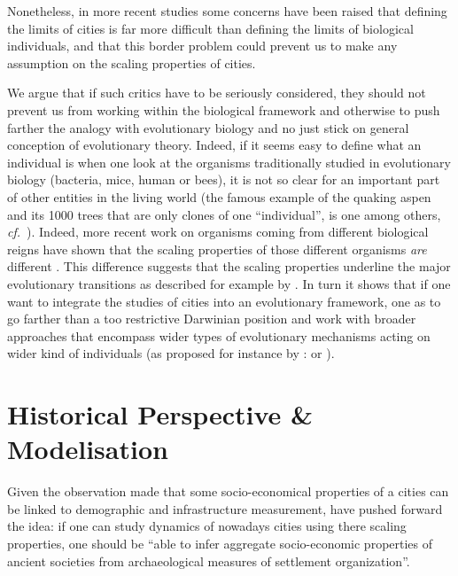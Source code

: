 \documentclass[a4paper,11pt]{article}
\begin{document}
Nonetheless, in more recent studies \citep{arcaute2015constructingcitiesdeconstructingscalinglaws} some concerns have been raised that defining the limits of cities is far more difficult than defining the limits of biological individuals, and that this border problem could prevent us to make any assumption on the scaling properties of cities. 

We argue that if such critics have to be seriously considered, they should not prevent us from working within the biological framework and otherwise to push farther the analogy with evolutionary biology and no just stick on general conception of evolutionary theory. Indeed, if it seems easy to define what an individual is when one look at the organisms traditionally studied in evolutionary biology (bacteria, mice, human or bees), it is not so clear for an important part of other entities in the living world (the famous example of the quaking aspen and its 1000 trees that are only clones of one ``individual'', is one among others, \emph{cf.}~\cite{bouchard2011darwinismwithoutpopulationsamoreinclusiveunderstandingofsotf}).
Indeed, more recent work on organisms coming from different biological reigns have shown that the scaling properties of those different organisms \emph{are} different \citep{delong2010shiftsinmetabolicscalingproductionandefficiencyacrossmajorevolutionarytransitionsoflife}. This difference suggests that the scaling properties underline the major evolutionary transitions as described for example by \cite{maynardsmith1997major}. In turn it shows that if one want to integrate the studies of cities into an evolutionary framework, one as to go farther than a too restrictive Darwinian position and work with broader approaches that encompass wider types of evolutionary mechanisms acting on wider kind of individuals (as proposed for instance by : \cite{godfrey2009darwinian} or \cite{jablonka2014evolution}). 


\section{Historical Perspective \& Modelisation}

Given the observation made that some socio-economical properties of a cities can be linked to demographic and infrastructure measurement, \cite{ortman2014theprehistoryofurbanscaling} have pushed forward the idea: if one can study dynamics of nowadays cities using there scaling properties, one should be ``able to infer aggregate socio-economic properties of ancient societies from archaeological measures of settlement organization''. 
\end{document}
